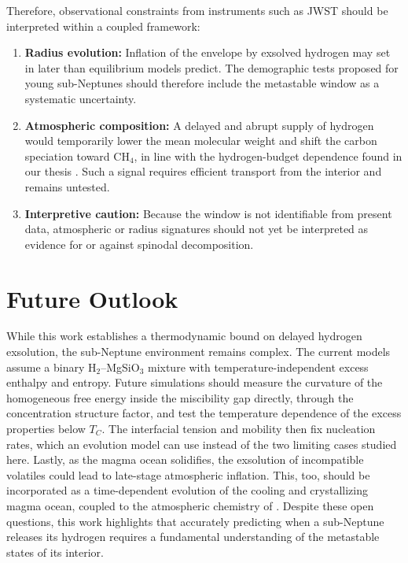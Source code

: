 Therefore, observational constraints from instruments such as JWST should be interpreted
within a coupled framework:
\begin{enumerate}
\item \textbf{Radius evolution:} Inflation of the envelope by exsolved hydrogen may set in later
than equilibrium models predict. The demographic tests proposed for young sub-Neptunes
\cite{rogers2026} should therefore include the metastable window as a systematic
uncertainty.
\item \textbf{Atmospheric composition:} A delayed and abrupt supply of hydrogen would
temporarily lower the mean molecular weight and shift the carbon speciation toward CH$_4$, in
line with the hydrogen-budget dependence found in our thesis \cite{laga2025}. Such a signal
requires efficient transport from the interior and remains untested.
\item \textbf{Interpretive caution:} Because the window is not identifiable from present data,
atmospheric or radius signatures should not yet be interpreted as evidence for or against
spinodal decomposition.
\end{enumerate}

\section{Future Outlook}

While this work establishes a thermodynamic bound on delayed hydrogen exsolution,
the sub-Neptune environment remains complex. The current models assume a binary
H$_2$--MgSiO$_3$ mixture with temperature-independent excess enthalpy and entropy. Future
simulations should measure the curvature of the homogeneous free energy inside the miscibility
gap directly, through the concentration structure factor, and test the temperature dependence
of the excess properties below $T_C$. The interfacial tension and mobility then fix nucleation
rates, which an evolution model can use instead of the two limiting cases studied here.
Lastly, as the magma ocean solidifies, the exsolution of incompatible volatiles could lead to
late-stage atmospheric inflation. This, too, should be incorporated as a time-dependent
evolution of the cooling and crystallizing magma ocean, coupled to the atmospheric chemistry
of \Atm{}. Despite these open questions, this work highlights that accurately predicting when
a sub-Neptune releases its hydrogen requires a fundamental understanding of the metastable
states of its interior.
